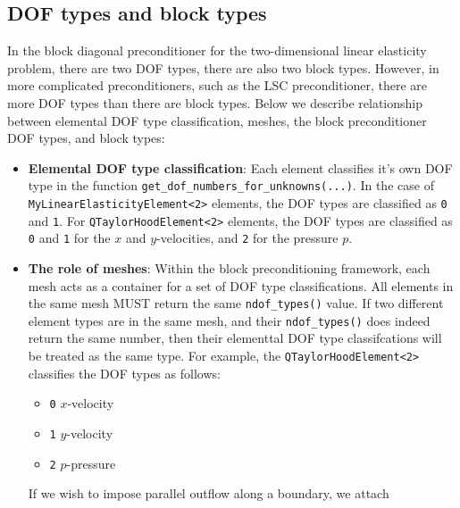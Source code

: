 \subsection{DOF types and block types\label{sec:dof_types_and_block_types}}
In the block diagonal preconditioner for the two-dimensional linear elasticity problem, there are two DOF types, there are also two block types. However, in more complicated preconditioners, such as the LSC preconditioner, there are more DOF types than there are block types. Below we describe relationship between elemental DOF type classification, meshes, the block preconditioner DOF types, and block types:
\begin{itemize}
\item \textbf{Elemental DOF type classification}: Each element classifies it's own DOF type in the function \verb+get_dof_numbers_for_unknowns(...)+. In the case of \verb+MyLinearElasticityElement<2>+ elements, the DOF types are classified as \verb+0+ and \verb+1+. For \verb+QTaylorHoodElement<2>+ elements, the DOF types are classified as \verb+0+ and \verb+1+ for the $x$ and $y$-velocities, and \verb+2+ for the pressure $p$. 

\item \textbf{The role of meshes}: Within the block preconditioning framework, each mesh acts as a container for a set of DOF type classifications. All elements in the same mesh MUST return the same \verb+ndof_types()+ value. If two different element types are in the same mesh, and their \verb+ndof_types()+ does indeed return the same number, then their elementtal DOF type classifcations will be treated as the same type. For example, the \verb+QTaylorHoodElement<2>+ classifies the DOF types as follows:
\begin{itemize}
 \item \verb+0+ $x$-velocity
 \item \verb+1+ $y$-velocity
 \item \verb+2+ $p$-pressure
\end{itemize}
If we wish to impose parallel outflow along a boundary, we attach 


\end{itemize}

